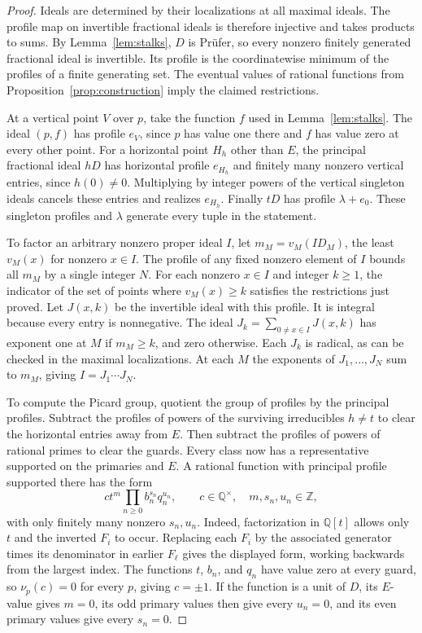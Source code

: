 \begin{proof}
    Ideals are determined by their localizations at all maximal ideals.
    The profile map on invertible fractional ideals is therefore injective and takes products to sums.
    By Lemma~\ref{lem:stalks}, $D$ is Pr\"ufer, so every nonzero finitely generated fractional ideal is invertible.
    Its profile is the coordinatewise minimum of the profiles of a finite generating set.
    The eventual values of rational functions from Proposition~\ref{prop:construction} imply the claimed restrictions.

    At a vertical point $V$ over $p$, take the function $f$ used in Lemma~\ref{lem:stalks}.
    The ideal $(p, f)$ has profile $e_V$, since $p$ has value one there and $f$ has value zero at every other point.
    For a horizontal point $H_h$ other than $E$, the principal fractional ideal $hD$ has horizontal profile $e_{H_h}$ and finitely many nonzero vertical entries, since $h(0) \ne 0$.
    Multiplying by integer powers of the vertical singleton ideals cancels these entries and realizes $e_{H_h}$.
    Finally $tD$ has profile $\lambda + e_0$.
    These singleton profiles and $\lambda$ generate every tuple in the statement.

    To factor an arbitrary nonzero proper ideal $I$, let $m_M = v_M(I D_M)$, the least $v_M(x)$ for nonzero $x \in I$.
    The profile of any fixed nonzero element of $I$ bounds all $m_M$ by a single integer $N$.
    For each nonzero $x \in I$ and integer $k \ge 1$, the indicator of the set of points where $v_M(x) \ge k$ satisfies the restrictions just proved.
    Let $J(x, k)$ be the invertible ideal with this profile.
    It is integral because every entry is nonnegative.
    The ideal $J_k = \sum_{0 \ne x \in I} J(x, k)$ has exponent one at $M$ if $m_M \ge k$, and zero otherwise.
    Each $J_k$ is radical, as can be checked in the maximal localizations.
    At each $M$ the exponents of $J_1, \ldots, J_N$ sum to $m_M$, giving $I = J_1 \cdots J_N$.

    To compute the Picard group, quotient the group of profiles by the principal profiles.
    Subtract the profiles of powers of the surviving irreducibles $h \ne t$ to clear the horizontal entries away from $E$.
    Then subtract the profiles of powers of rational primes to clear the guards.
    Every class now has a representative supported on the primaries and $E$.
    A rational function with principal profile supported there has the form
    \[
        c t^m \prod_{n \ge 0} b_n^{s_n} q_n^{u_n},
        \qquad
        c \in \mathbb{Q}^\times,\quad m, s_n, u_n \in \mathbb{Z},
    \]
    with only finitely many nonzero $s_n, u_n$.
    Indeed, factorization in $\mathbb{Q}[t]$ allows only $t$ and the inverted $F_i$ to occur.
    Replacing each $F_i$ by the associated generator times its denominator in earlier $F_\ell$ gives the displayed form, working backwards from the largest index.
    The functions $t$, $b_n$, and $q_n$ have value zero at every guard, so $\nu_p(c) = 0$ for every $p$, giving $c = \pm 1$.
    If the function is a unit of $D$, its $E$-value gives $m = 0$, its odd primary values then give every $u_n = 0$, and its even primary values give every $s_n = 0$.


\end{proof}
